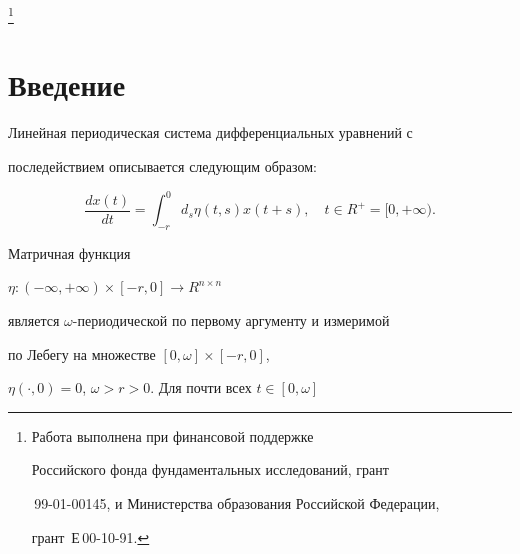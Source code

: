 \thanks{Работа выполнена при финансовой поддержке 


Российского фонда фундаментальных исследований, грант


\No\,99-01-00145, и Министерства образования Российской Федерации,


грант \No\,Е\,00-10-91.}





\date{}




\pagestyle{plain} %







\maketitle


\label{begin}











\section{Введение}





Линейная периодическая система дифференциальных уравнений с


последействием описывается следующим образом:


\begin{equation}


\frac{dx(t)}{dt} =


\int_{-r}^{0} d_{s} \eta (t,s) x(t+s), \quad t\in R^{+}=[0,+\infty).


\end{equation}


Матричная функция


$\eta:(-\infty,+\infty)\times[-r,0]\rightarrow R^{n\times n}$


является $\omega$-периодической по первому аргументу и измеримой


по Лебегу на множестве $[0,\omega] \times [-r,0]$,


$\eta(\cdot,0)=0$, $\omega>r>0$. Для почти всех $t\in[0,\omega]$


